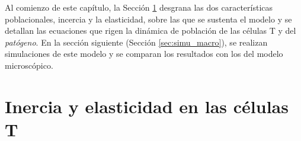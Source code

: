 Al comienzo de este capítulo, la Sección \ref{sec:iner_elast} desgrana las dos características poblacionales, incercia y la elasticidad, sobre las que se sustenta el modelo y se detallan las ecuaciones que rigen la dinámica de población de las células T y del \textit{patógeno}. En la sección siguiente (Sección \ref{sec:simu_macro}), se realizan simulaciones de este modelo y se comparan los resultados con los del modelo microscópico.





\section{Inercia y elasticidad en las células T}
\label{sec:iner_elast}


